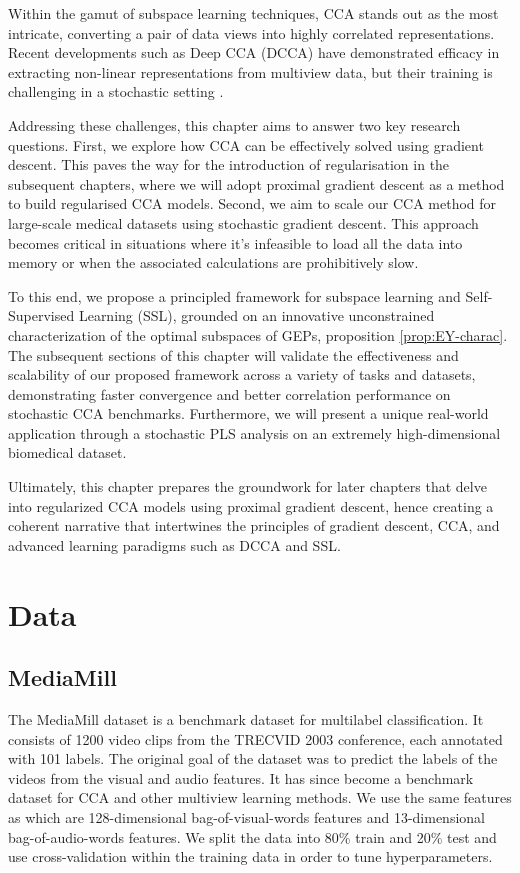 Within the gamut of subspace learning techniques, CCA stands out as the most intricate, converting a pair of data views into highly correlated representations. Recent developments such as Deep CCA (DCCA) \cite{andrew2013deep} have demonstrated efficacy in extracting non-linear representations from multiview data, but their training is challenging in a stochastic setting \cite{wang2015stochastic}.

Addressing these challenges, this chapter aims to answer two key research questions. First, we explore how CCA can be effectively solved using gradient descent. This paves the way for the introduction of regularisation in the subsequent chapters, where we will adopt proximal gradient descent as a method to build regularised CCA models. Second, we aim to scale our CCA method for large-scale medical datasets using stochastic gradient descent. This approach becomes critical in situations where it's infeasible to load all the data into memory or when the associated calculations are prohibitively slow.

To this end, we propose a principled framework for subspace learning and Self-Supervised Learning (SSL), grounded on an innovative unconstrained characterization of the optimal subspaces of GEPs, proposition \ref{prop:EY-charac}. The subsequent sections of this chapter will validate the effectiveness and scalability of our proposed framework across a variety of tasks and datasets, demonstrating faster convergence and better correlation performance on stochastic CCA benchmarks. Furthermore, we will present a unique real-world application through a stochastic PLS analysis on an extremely high-dimensional biomedical dataset.

Ultimately, this chapter prepares the groundwork for later chapters that delve into regularized CCA models using proximal gradient descent, hence creating a coherent narrative that intertwines the principles of gradient descent, CCA, and advanced learning paradigms such as DCCA and SSL.


\section{Data}
\subsection{MediaMill}
The MediaMill dataset \cite{feng2004context} is a benchmark dataset for multilabel classification. It consists of 1200 video clips from the TRECVID 2003 conference, each annotated with 101 labels. The original goal of the dataset was to predict the labels of the videos from the visual and audio features. It has since become a benchmark dataset for CCA and other multiview learning methods. We use the same features as \cite{gemp2022generalized} which are 128-dimensional bag-of-visual-words features and 13-dimensional bag-of-audio-words features. We split the data into 80\% train and 20\% test and use cross-validation within the training data in order to tune hyperparameters.

